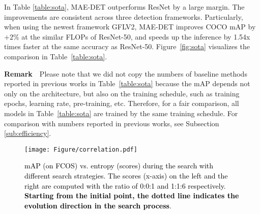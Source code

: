 \documentclass[nohyperref]{article}
\theoremstyle{plain}
\theoremstyle{definition}
\theoremstyle{remark}
\begin{document}
In Table \ref{table:sota}, MAE-DET outperforms ResNet by a large margin. The improvements are consistent across three detection frameworks. Particularly, when using the newest framework GFLV2, MAE-DET improves COCO mAP by $+2\%$ at the similar FLOPs of ResNet-50, and speeds up the inference by 1.54x times faster at the same accuracy as ResNet-50. Figure~\ref{fig:sota} visualizes the comparison in Table~\ref{table:sota}.

\noindent \textbf{Remark}$\quad$Please note that we did not copy the numbers of baseline methods reported in previous works in Table~\ref{table:sota} because the mAP depends not only on the architecture, but also on the training schedule, such as training epochs, learning rate, pre-training, etc. Therefore, for a fair comparison, all models in Table~\ref{table:sota} are trained by the same training schedule. For comparison with numbers reported in previous works, see Subsection \ref{sub:efficiency}.

\begin{figure*}[h]
	\centering
	\texttt{[image: Figure/correlation.pdf]}
	\caption{\textcolor{black}{mAP (on FCOS) vs. entropy (scores) during the search with different search strategies. The scores (x-axis) on the left and the right are computed with the ratio of 0:0:1 and 1:1:6 respectively. \textbf{Starting from the initial point, the dotted line indicates the evolution direction in the search process}.}}
	\label{fig:corre}
\end{figure*}
\end{document}
